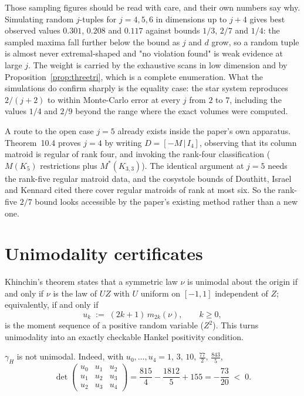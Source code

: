 Those sampling figures should be read with care, and their own numbers
say why.  Simulating random $j$-tuples for $j=4,5,6$ in dimensions up to
$j+4$ gives best observed values $0.301$, $0.208$ and $0.117$ against
bounds $1/3$, $2/7$ and $1/4$: the sampled maxima fall further below the
bound as $j$ and $d$ grow, so a random tuple is almost never
extremal-shaped and "no violation found" is weak evidence at large $j$.
The weight is carried by the exhaustive scans in low dimension and by
Proposition~\ref{prop:threetri}, which is a complete enumeration.  What
the simulations do confirm sharply is the equality case: the star system
reproduces $2/(j+2)$ to within Monte-Carlo error at every $j$ from $2$
to $7$, including the values $1/4$ and $2/9$ beyond the range where the
exact volumes were computed.

A route to the open case $j=5$ already exists inside the paper's own
apparatus.  Theorem~10.4 proves $j=4$ by writing $D=[-M\,|\,I_4]$,
observing that its column matroid is regular of rank four, and invoking
the rank-four classification ($M(K_5)$ restrictions plus
$M^*(K_{3,3})$).  The identical argument at $j=5$ needs the rank-five
regular matroid data, and the cosystole bounds of Douthitt, Israel and
Kennard cited there cover regular matroids of rank at most six.  So the
rank-five $2/7$ bound looks accessible by the paper's existing method
rather than a new one.

\section{Unimodality certificates}

Khinchin's theorem states that a symmetric law $\nu$ is unimodal about
the origin if and only if $\nu$ is the law of $UZ$ with $U$ uniform on
$[-1,1]$ independent of $Z$; equivalently, if and only if
\[
u_k\;:=\;(2k+1)\,m_{2k}(\nu),\qquad k\ge0,
\]
is the moment sequence of a positive random variable ($Z^2$).  This turns
unimodality into an exactly checkable Hankel positivity condition.

\begin{proposition}\label{prop:hnonuni}
$\gamma_H$ is not unimodal.  Indeed, with
$u_0,\dots,u_4=1,\,3,\,10,\,\tfrac{77}2,\,\tfrac{843}5$,
\[
\det\begin{pmatrix}u_0&u_1&u_2\\u_1&u_2&u_3\\u_2&u_3&u_4\end{pmatrix}
=\frac{815}{4}-\frac{1812}{5}+155=-\frac{73}{20}\;<\;0 .
\]
\end{proposition}

